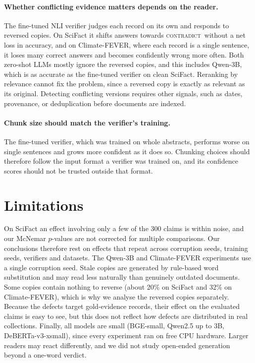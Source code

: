 \documentclass[11pt]{article}
\newcommand{\Con}{\textsc{contradict}}
\begin{document}
\paragraph{Whether conflicting evidence matters depends on the reader.} The fine-tuned NLI verifier judges each
record on its own and responds to reversed copies. On SciFact it shifts answers towards \Con\ without a net
loss in accuracy, and on Climate-FEVER, where each record is a single sentence, it loses many correct answers
and becomes confidently wrong more often. Both zero-shot LLMs mostly ignore the reversed copies, and this
includes Qwen-3B, which is as accurate as the fine-tuned verifier on clean SciFact. Reranking by relevance
cannot fix the problem, since a reversed copy is exactly as relevant as its original. Detecting conflicting
versions requires other signals, such as dates, provenance, or deduplication before documents are indexed.

\paragraph{Chunk size should match the verifier's training.} The fine-tuned verifier, which was trained on whole
abstracts, performs worse on single sentences and grows more confident as it does so. Chunking choices should
therefore follow the input format a verifier was trained on, and its confidence scores should not be trusted
outside that format.

\section*{Limitations}

On SciFact an effect involving only a few of the 300 claims is within noise, and our McNemar $p$-values are not
corrected for multiple comparisons. Our conclusions therefore rest on effects that repeat across corruption
seeds, training seeds, verifiers and datasets. The Qwen-3B and Climate-FEVER experiments use a single corruption
seed. Stale copies are generated by rule-based word substitution and may read less naturally than genuinely
outdated documents. Some copies contain nothing to reverse (about 20\% on SciFact and 32\% on Climate-FEVER),
which is why we analyse the reversed copies separately. Because the defects target gold-evidence records, their
effect on the evaluated claims is easy to see, but this does not reflect how defects are distributed in real
collections. Finally, all models are small (BGE-small, Qwen2.5 up to 3B, DeBERTa-v3-xsmall), since every
experiment ran on free CPU hardware. Larger readers may react differently, and we did not study open-ended
generation beyond a one-word verdict.
\end{document}
